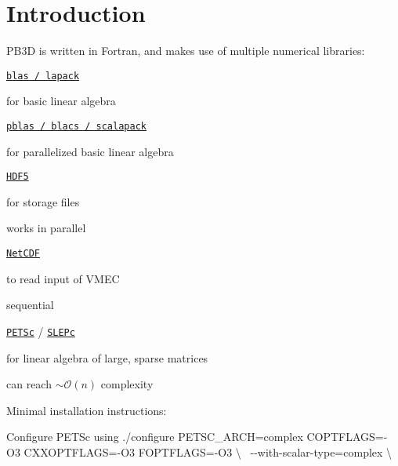 \hypertarget{page_installation_installation_introduction}{}\section{Introduction}\label{page_installation_installation_introduction}
P\+B3D is written in Fortran, and makes use of multiple numerical libraries\+:
\begin{DoxyItemize}
\item \href{http://www.netlib.org/lapack/}{\tt blas / lapack}
\begin{DoxyItemize}
\item for basic linear algebra
\end{DoxyItemize}
\item \href{http://www.netlib.org/scalapack/}{\tt pblas / blacs / scalapack}
\begin{DoxyItemize}
\item for parallelized basic linear algebra
\end{DoxyItemize}
\item \href{https://www.hdfgroup.org/HDF5/}{\tt H\+D\+F5}
\begin{DoxyItemize}
\item for storage files
\item works in parallel
\end{DoxyItemize}
\item \href{https://www.unidata.ucar.edu/software/netcdf/}{\tt Net\+C\+DF}
\begin{DoxyItemize}
\item to read input of V\+M\+EC
\item sequential
\end{DoxyItemize}
\item \href{https://www.mcs.anl.gov/petsc/}{\tt P\+E\+T\+Sc} / \href{http://slepc.upv.es/}{\tt S\+L\+E\+Pc}
\begin{DoxyItemize}
\item for linear algebra of large, sparse matrices
\item can reach $\sim \mathcal{O} (n)$ complexity
\item Minimal installation instructions\+:
\begin{DoxyEnumerate}
\item Configure P\+E\+T\+Sc using {\ttfamily ./configure P\+E\+T\+S\+C\+\_\+\+A\+R\+CH=complex C\+O\+P\+T\+F\+L\+A\+GS=-\/\+O3 C\+X\+X\+O\+P\+T\+F\+L\+A\+GS=-\/\+O3 F\+O\+P\+T\+F\+L\+A\+GS=-\/\+O3 \textbackslash{}}~\newline
 {\ttfamily -\/-\/with-\/scalar-\/type=complex \textbackslash{}}~\newline

\end{DoxyEnumerate}
\end{DoxyItemize}
\end{DoxyItemize}
